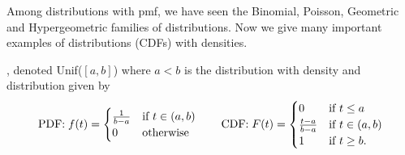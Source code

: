 \documentclass[preprint,  11pt]{amsart}
\begin{document}
Among distributions with pmf, we have seen the Binomial, Poisson, Geometric and Hypergeometric families of distributions. Now we give many important examples of distributions (CDFs) with densities.


\beg {}, denoted Unif($[a,b]$) where $a<b$ is the distribution with density and distribution given by
$$
\mbox{PDF:}\; f(t) = \begin{cases}\frac{1}{b-a} & \mbox{if } t\in(a,b) \\ 0 & \mbox{otherwise} \end{cases}\qquad
\mbox{CDF:}\; F(t) = \begin{cases}0 & \mbox{if } t\le a \\ \frac{t-a}{b-a} & \mbox{if }t\in (a,b) \\ 1 & \mbox{if }t\ge b.\end{cases}
$$

\eeg
\end{document}
